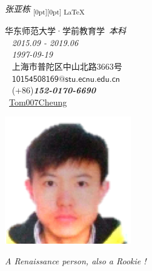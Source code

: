 \documentclass[a4paper, 12pt, oneside]{article}
\begin{document}
\newcommand\myworries[1]{\textcolor{red}{#1}}
\pagestyle{empty}
    \begin{tcolorbox}[colback=red!58!white,colframe=red!75!black]
        \Large \textit{张亚栋} \hfill\textsubscript{\raisebox{0pt}[0pt][0pt]{\large\faHeartO\raisebox{0.3ex}{\fontsize{12pt}{12pt}\faHeartO}%
    \raisebox{2.2ex}{\fontsize{11pt}{11pt}\faHeartO}%
    \raisebox{4.5ex}{\fontsize{10pt}{10pt}\faHeartO}
    \LaTeX
}}
    \end{tcolorbox}
    \begin{minipage}[t]{0.6\linewidth}
    \noindent
    \textcolor{red}{\faGraduationCap} 华东师范大学·学前教育学~\emph{本科}\\
    \textcolor{black}{\faCalendar}~ \emph{2015.09 - 2019.06}\\
    \textcolor{blue}{\faMars}~ \emph{1997-09-19}\\
    \textcolor{yellow}{\faMapMarker}~ 上海市普陀区中山北路3663号\\
    \textcolor{cyan}{\faEnvelope}~ $\mathsf{10154508169@stu.ecnu.edu.cn}$ \\ 
    \textcolor{black}{\fontsize{18pt}{18pt}\faMobile}~ (+86)\textbf{\emph{152-0170-6690}}\\
    \faGithubAlt~\href{https://github.com/Tom007Cheung}{Tom007Cheung}
    \end{minipage}
    \begin{minipage}[t]{0.1\linewidth}
    \begin{center}
        \includegraphics{photo.png}
    \end{center}
    \end{minipage}
    \begin{shadequote}{}
    \par
        \emph{A Renaissance person, also a Rookie !}
    \par
    \end{shadequote}
\end{document}
